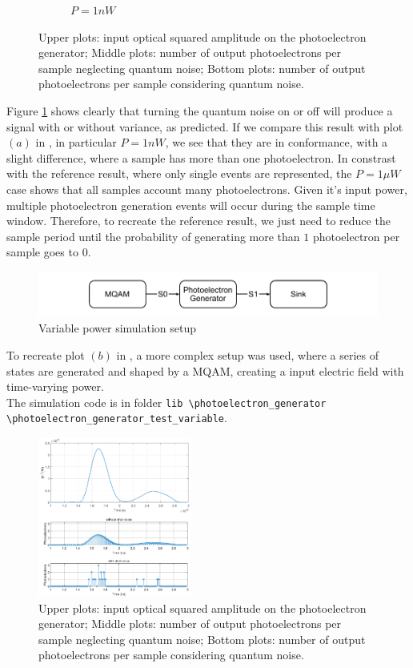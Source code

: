 \begin{figure}[H]
\begin{subfigure}{0.45\textwidth}
		\caption{$P=1 nW$}
	\end{subfigure}
	\caption{Upper plots: input optical squared amplitude on the photoelectron generator; Middle plots: number of output photoelectrons per sample neglecting quantum noise; Bottom plots: number of output photoelectrons per sample considering quantum noise.}
	\label{plot:quantum_noise_sim_constant}
\end{figure}
%
Figure \ref{plot:quantum_noise_sim_constant} shows clearly that turning the quantum noise on or off will produce a signal with or without variance, as predicted.
If we compare this result with plot $(a)$ in \cite{saleh1991}, in particular $P=1nW$, we see that they are in conformance, with a slight difference, where a sample has more than one photoelectron.
In constrast with the reference result, where only single events are represented, the $P=1 \mu W$ case shows that all samples account many photoelectrons.
Given it's input power, multiple photoelectron generation events will occur during the sample time window.
Therefore, to recreate the reference result, we just need to reduce the sample period until the probability of generating more than $1$ photoelectron per sample goes to $0$.
\\
%
\begin{figure}[H]
	\centering
	\includegraphics{./lib/photoelectron_generator/figures/scheme_simulation_variable.pdf}
	\caption{Variable power simulation setup}
\end{figure}
%
To recreate plot $(b)$ in \cite{saleh1991}, a more complex setup was used, where a series of states are generated and shaped by a MQAM, creating a input electric field with time-varying power.\\
The simulation code is in folder \texttt{lib \textbackslash photoelectron\_generator \textbackslash photoelectron\_generator\_test\_variable}.
%
\begin{figure}[H]
	\centering
	\includegraphics[width=0.45\textwidth]{./lib/photoelectron_generator/figures/plot-variable}
	\caption{Upper plots: input optical squared amplitude on the photoelectron generator; Middle plots: number of output photoelectrons per sample neglecting quantum noise; Bottom plots: number of output photoelectrons per sample considering quantum noise.}
	\label{plot:quantum_noise_sim_variable}
\end{figure}
